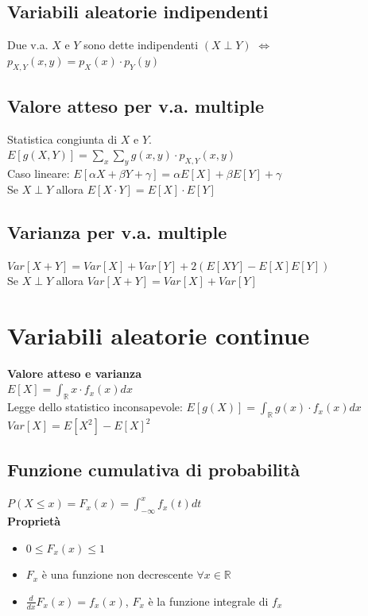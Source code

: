 \documentclass{article}
\begin{document}
\begin{multicols*}{3}
		\subsection{Variabili aleatorie indipendenti}
		Due v.a. \(X\) e \(Y\) sono dette indipendenti \((X\perp Y)\) \(\iff\) \(p_{X,Y} (x,y) = p_X (x)\cdot p_Y (y) \)\\
		
		\subsection{Valore atteso per v.a. multiple}
		Statistica congiunta di \(X\) e \(Y\).\\
		\(E[g(X,Y)] = \sum_{x}^{}\sum_{y}^{} g(x,y) \cdot p_{X,Y} (x,y)\)\\
		Caso lineare: \(E[\alpha X + \beta Y + \gamma] = \alpha E[X] + \beta E[Y] + \gamma\) \\
		Se \(X \perp Y\) allora \(E[X \cdot Y] = E[X] \cdot E[Y]\)
		
		\subsection{Varianza per v.a. multiple}
		\(Var[X+Y]= Var[X] + Var[Y] +2(E[XY] -E[X]E[Y])\)\\
		Se \(X\perp Y\) allora \(Var[X+Y] = Var[X] + Var[Y]\)\\
		
		\section{Variabili aleatorie continue}
		\textbf{Valore atteso e varianza}\\
		\(E[X] = \int_{\mathbb{R}}^{} x \cdot f_x (x) dx\)\\
		Legge dello statistico inconsapevole: \(E[g(X)] = \int_{\mathbb{R}}^{} g(x) \cdot f_x (x) dx\)\\
		\(Var[X] = E[X^2] - E[X]^2\)
		
		
		
		\subsection{Funzione cumulativa di probabilità}
		\(P(X\leq x) = F_x (x) = \int_{-\infty}^{x} f_x (t) dt\)\\
		\textbf{Proprietà}
		\begin{itemize}
			\item \(0\leq F_x (x) \leq 1\)
			\item \(F_x\) è una funzione non decrescente \(\forall x \in \mathbb{R}\)
			\item \(\frac{d}{dx} F_x (x) = f_x (x)\), \(F_x\) è la funzione integrale di \(f_x\)  
		\end{itemize}
				

\end{multicols*}
\end{document}
